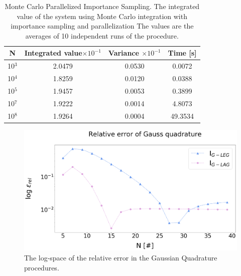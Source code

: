 \documentclass[%
reprint,nofootinbib,
amsmath,amssymb,
aps,
]{revtex4-1}
\begin{document}
\begin{table}[!h]
	\caption{Monte Carlo Parallelized Importance Sampling. 	\label{mc_values_par} \centering The integrated value of the system using Monte Carlo integration with importance sampling and parallelization The values are the averages of 10 independent runs of the procedure. }
	\begin{tabular}{|c|c|c|c|}
		\hline 
		\hspace{5mm} \textbf{N} \hspace{5mm} & \textbf{Integrated value}$\times 10^{-1}$ & \hspace{3mm} \textbf{Variance} $\times 10^{-1}$ & \hspace{3mm} \textbf{Time  [s]} \hspace{5mm}\\
		\hline 
			10$^3$ & 2.0479  & 0.0530  & 0.0072 \\
			10$^4$ & 1.8259  & 0.0120  & 0.0388 \\
			10$^5$ & 1.9457  & 0.0053  & 0.3899 \\
			10$^7$ & 1.9222  & 0.0014  & 4.8073 \\
			10$^8$ & 1.9264  & 0.0004  & 49.3534 \\
		\hline 
	\end{tabular}
\end{table}
\begin{figure}[H]
	\centering
	\includegraphics[scale = 0.3]{Gauss_lagleg_err.png}
	\caption{\label{laglegerr} The log-space of the relative error in the Gaussian Quadrature procedures.}
\end{figure} \newpage 
\end{document}
